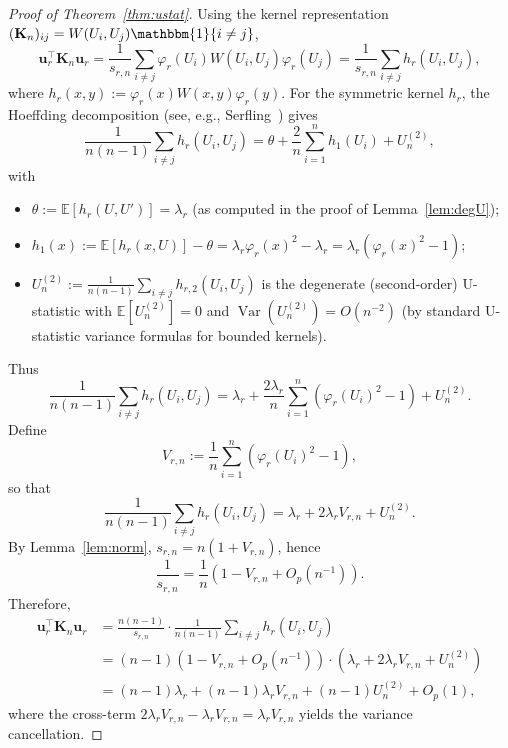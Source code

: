\documentclass[11pt]{article}
\theoremstyle{plain}
\theoremstyle{remark}
\DeclareMathOperator{\Var}{Var}
\begin{document}
\begin{proof}[Proof of Theorem~\ref{thm:ustat}]
Using the kernel representation $(\mathbf{K}_n)_{ij} = W(U_i,U_j)\mathbbm{1}\{i \neq j\}$,
\[
\mathbf{u}_r^\top \mathbf{K}_n \mathbf{u}_r
= \frac{1}{s_{r,n}} \sum_{i \neq j} \varphi_r(U_i) W(U_i, U_j) \varphi_r(U_j)
= \frac{1}{s_{r,n}} \sum_{i \neq j} h_r(U_i, U_j),
\]
where $h_r(x,y) := \varphi_r(x)W(x,y)\varphi_r(y)$. For the symmetric kernel $h_r$, the Hoeffding
decomposition (see, e.g., Serfling~\citet[Section 5.3]{serfling2009approximation}) gives
\[
\frac{1}{n(n-1)}\sum_{i \neq j} h_r(U_i, U_j)
= \theta + \frac{2}{n}\sum_{i=1}^n h_1(U_i) + U_n^{(2)},
\]
with 
\begin{itemize} \item $\theta := \mathbb{E}[h_r(U,U')] = \lambda_r$ (as computed in the proof of Lemma~\ref{lem:degU}); \item $h_1(x) := \mathbb{E}[h_r(x,U)] - \theta = \lambda_r\varphi_r(x)^2 - \lambda_r = \lambda_r(\varphi_r(x)^2 - 1)$; \item $U_n^{(2)} := \frac{1}{n(n-1)}\sum_{i \neq j} h_{r,2}(U_i, U_j)$ is the degenerate (second-order) U-statistic with $\mathbb{E}[U_n^{(2)}] = 0$ and $\Var(U_n^{(2)}) = O(n^{-2})$ (by standard U-statistic variance formulas for bounded kernels). \end{itemize}  Thus   \[ \frac{1}{n(n-1)}\sum_{i \neq j} h_r(U_i, U_j) = \lambda_r + \frac{2\lambda_r}{n}\sum_{i=1}^n (\varphi_r(U_i)^2 - 1) + U_n^{(2)}. \]   Define   \[ V_{r,n} := \frac{1}{n}\sum_{i=1}^n (\varphi_r(U_i)^2 - 1), \]   so that   \[ \frac{1}{n(n-1)}\sum_{i \neq j} h_r(U_i, U_j) = \lambda_r + 2\lambda_r V_{r,n} + U_n^{(2)}. \]
By Lemma~\ref{lem:norm}, $s_{r,n} = n(1 + V_{r,n})$, hence
\[
\frac{1}{s_{r,n}} = \frac{1}{n}(1 - V_{r,n} + O_p(n^{-1})).
\]
Therefore,
\begin{align*}
\mathbf{u}_r^\top \mathbf{K}_n \mathbf{u}_r
&= \frac{n(n-1)}{s_{r,n}} \cdot \frac{1}{n(n-1)}\sum_{i \neq j} h_r(U_i, U_j) \\
&= (n-1)(1 - V_{r,n} + O_p(n^{-1})) \cdot (\lambda_r + 2\lambda_r V_{r,n} + U_n^{(2)}) \\
&= (n-1)\lambda_r + (n-1)\lambda_r V_{r,n} + (n-1)U_n^{(2)} + O_p(1),
\end{align*}
where the cross-term $2\lambda_r V_{r,n} - \lambda_r V_{r,n} = \lambda_r V_{r,n}$ yields the
variance cancellation.


\end{proof}
\end{document}
